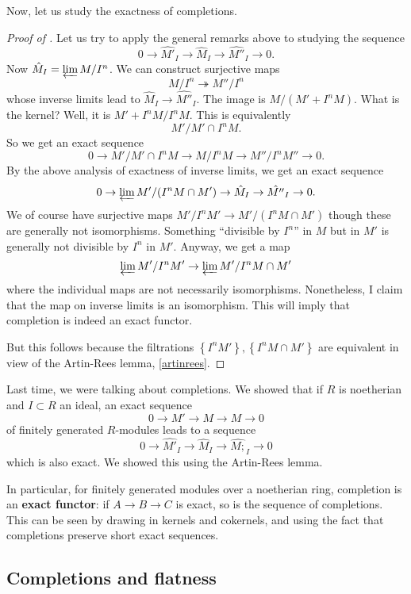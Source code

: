 Now, let us study the exactness of completions.
\begin{proof}[Proof of ]

Let us try to apply the general remarks above to studying the sequence 
\[ 0 \to \hat{M'}_I \to \hat{M}_I \to \hat{M''}_I \to 0.  \]
Now $\hat{M}_I = \varprojlim M/I^n$. We can construct  surjective maps
\[ M/I^n \twoheadrightarrow M''/I^n  \]
whose inverse limits lead to $\hat{M}_I \to \hat{M''}_I$. The image is
$M/(M' + I^n M)$. What is the kernel?
Well, it is $M' + I^n M/ I^n M$.  This is equivalently
\[ M'/M' \cap I^n M.  \]
So we get an exact sequence
\[ 0 \to M'/M' \cap I^n M \to M/I^n M \to M''/I^n M'' \to 0.  \]
By the above analysis of exactness of inverse limits, we get an exact sequence
\[ 0 \to \varprojlim M'/(I^n M \cap M') \to \hat{M}_I \to \hat{M''}_I \to 0.  \]
We of course have surjective maps $M'/I^n M' \to M'/(I^n M \cap M') $ though
these are generally not isomorphisms. Something ``divisible by $I^n$'' in $M$ but
in $M'$ is generally not divisible by $I^n$ in $M'$.
Anyway, we get a map
\[ \varprojlim M'/I^n M' \to \varprojlim M'/I^n M \cap M'  \]
where the individual maps are not necessarily isomorphisms. Nonetheless, I
claim that the map on inverse limits is an isomorphism. This will imply that
completion is indeed an exact functor.

But this follows because the filtrations $\left\{I^n M'\right\},
\left\{I^n M \cap M'\right\}$ are equivalent in view of the Artin-Rees lemma,
\cref{artinrees}.
\end{proof} 

Last time, we were talking about completions. We showed that if $R$ is
noetherian and $I \subset R$ an ideal, an exact sequence
\[ 0 \to M' \to M \to M \to 0   \]
of finitely generated $R$-modules leads to a sequence
\[ 0 \to \hat{M'}_I \to \hat{M}_I \to \hat{M;}_I \to 0  \]
which is also exact. We showed this using the Artin-Rees lemma.

\begin{remark}
In particular, for finitely generated modules over a noetherian ring, completion is an \textbf{exact functor}: if $A \to B \to C$ is
exact, so is the sequence of completions. This can be seen by drawing in
kernels and cokernels, and using the fact that completions preserve short
exact sequences. 
\end{remark}

\subsection{Completions and flatness}

